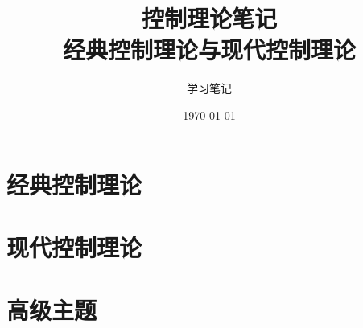 \documentclass[12pt,a4paper]{article}
\title{\textbf{控制理论笔记}\\[0.5em]\large 经典控制理论与现代控制理论}
\author{学习笔记}
\date{\today}
\begin{document}
\maketitle
\tableofcontents
\newpage

\part{经典控制理论}

























\part{现代控制理论}















\part{高级主题}



\end{document}
